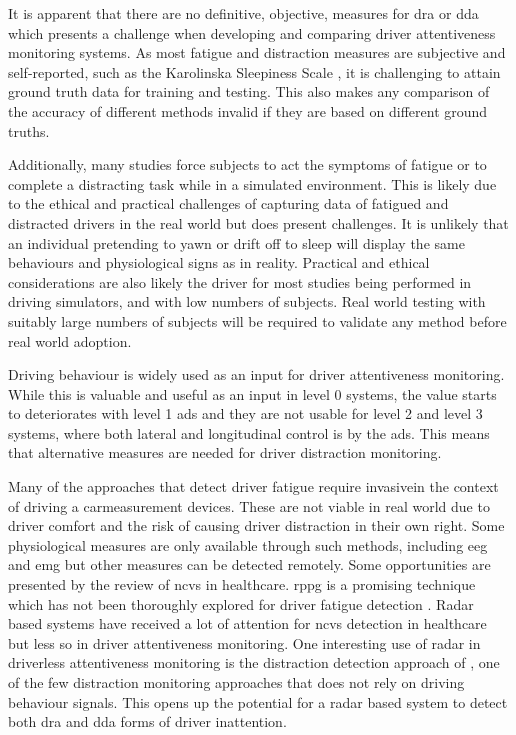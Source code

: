 \documentclass[11pt, parskip=half*,twoside=false]{scrbook}
\begin{document}
{It is apparent that there are no definitive, objective, measures for \gls{dra} or \gls{dda} which presents a challenge when developing and comparing driver attentiveness monitoring systems. As most fatigue and distraction measures are subjective and self-reported, such as the Karolinska Sleepiness Scale \citep{kaidaValidationKarolinskaSleepiness2006}, it is challenging to attain ground truth data for training and testing. This also makes any comparison of the accuracy of different methods invalid if they are based on different ground truths. 

Additionally, many studies force subjects to act the symptoms of fatigue or to complete a distracting task while in a simulated environment. This is likely due to the ethical and practical challenges of capturing data of fatigued and distracted drivers in the real world but does present challenges. It is unlikely that an individual pretending to yawn or drift off to sleep will display the same behaviours and physiological signs as in reality. Practical and ethical considerations are also likely the driver for most studies being performed in driving simulators, and with low numbers of subjects. Real world testing with suitably large numbers of subjects will be required to validate any method before real world adoption.

Driving behaviour is widely used as an input for driver attentiveness monitoring. While this is valuable and useful as an input in level 0 systems, the value starts to deteriorates with level 1 \gls{ads} and they are not usable for level 2 and level 3 systems, where both lateral and longitudinal control is by the \gls{ads}. This means that alternative measures are needed for driver distraction monitoring. 

Many of the approaches that detect driver fatigue require invasive\textemdash in the context of driving a car\textemdash measurement devices. These are not viable in real world due to driver comfort and the risk of causing driver distraction in their own right. Some physiological measures are only available through such methods, including \gls{eeg} and \gls{emg} but other measures can be detected remotely. Some opportunities are presented by the review of \gls{ncvs} in healthcare. \gls{rppg} is a promising technique which has not been thoroughly explored for driver fatigue detection \citep{sikanderDriverFatigueDetection2019}. Radar based systems have received a lot of attention for \gls{ncvs} detection in healthcare \citep{sikanderDriverFatigueDetection2019} but less so in driver attentiveness monitoring. One interesting use of radar in driverless attentiveness monitoring is the distraction detection approach of \citet{dingInattentiveDrivingBehavior2019}, one of the few distraction monitoring approaches that does not rely on driving behaviour signals. This opens up the potential for a radar based system to detect both \gls{dra} and \gls{dda} forms of driver inattention.


}
\end{document}
